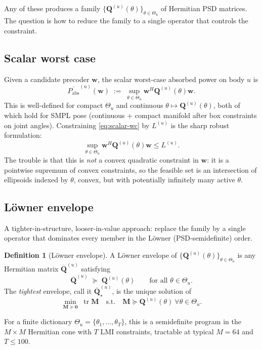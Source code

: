 \documentclass[11pt,a4paper]{article}
\theoremstyle{definition}
\newtheorem{definition}[definition]{Definition}
\newcommand{\ww}{\mathbf{w}}
\newcommand{\zero}{\mathbf{0}}
\newcommand{\Pabs}{P_{\mathrm{abs}}}
\newcommand{\Q}{\mathbf{Q}}
\newcommand{\Qbar}{\overline{\mathbf{Q}}}
\DeclareMathOperator{\tr}{tr}
\newcommand{\Poses}{\Theta}
\begin{document}
Any of these produces a family
$\{\Q^{(u)}(\theta)\}_{\theta\in\Poses_u}$ of Hermitian PSD matrices.
The question is how to reduce the family to a single operator that
controls the constraint.

\subsection{Scalar worst case}

Given a candidate precoder $\ww$, the scalar worst-case absorbed
power on body $u$ is
\begin{equation}\label{eq:scalar-wc}
  \overline{\Pabs}^{(u)}(\ww)
  \;:=\;\sup_{\theta\in\Poses_u}
  \ww^H\Q^{(u)}(\theta)\ww.
\end{equation}
This is well-defined for compact $\Poses_u$ and continuous
$\theta\mapsto\Q^{(u)}(\theta)$, both of which hold for SMPL pose
(continuous + compact manifold after box constraints on joint
angles). Constraining \eqref{eq:scalar-wc} by $L^{(u)}$ is the sharp
robust formulation:
\[
  \sup_{\theta\in\Poses_u}\ww^H\Q^{(u)}(\theta)\ww \le L^{(u)}.
\]
The trouble is that this is \emph{not} a convex quadratic constraint
in $\ww$: it is a pointwise supremum of convex constraints, so the
feasible set is an intersection of ellipsoids indexed by $\theta$,
convex, but with potentially infinitely many active $\theta$.

\subsection{Löwner envelope}

A tighter-in-structure, looser-in-value approach: replace the family
by a single operator that dominates every member in the Löwner
(PSD-semidefinite) order.

\begin{definition}[Löwner envelope]\label{def:loewner}
A Löwner envelope of $\{\Q^{(u)}(\theta)\}_{\theta\in\Poses_u}$ is
any Hermitian matrix $\Qbar^{(u)}$ satisfying
\[
  \Qbar^{(u)}\;\succeq\;\Q^{(u)}(\theta)
  \qquad\text{for all }\theta\in\Poses_u.
\]
The \emph{tightest} envelope, call it $\Qbar^{(u)}_\star$, is the
unique solution of
\[
  \min_{\mathbf{M}\succeq\zero}\;\tr\mathbf{M}
  \quad\text{s.t.}\quad
  \mathbf{M}\succeq\Q^{(u)}(\theta)\ \forall\theta\in\Poses_u.
\]
\end{definition}

For a finite dictionary $\Poses_u=\{\theta_1,\ldots,\theta_T\}$, this
is a semidefinite program in the $M\times M$ Hermitian cone with $T$
LMI constraints, tractable at typical $M=64$ and $T\le 100$.
\end{document}
